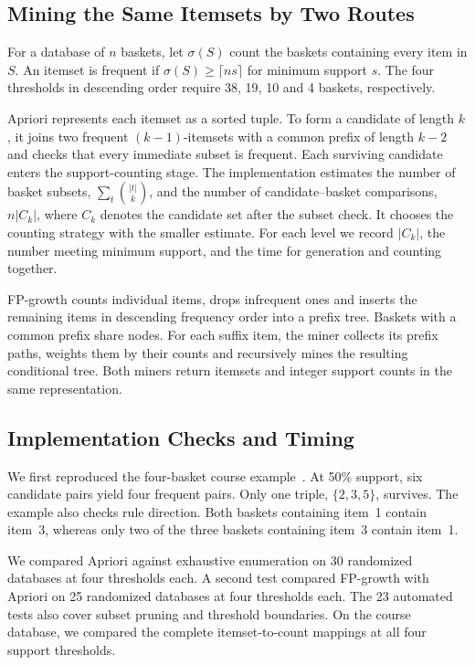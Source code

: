 \documentclass[journal]{IEEEtran}
\begin{document}
\subsection{Mining the Same Itemsets by Two Routes}
For a database of $n$ baskets, let $\sigma(S)$ count the baskets containing every item in $S$. An itemset is frequent if $\sigma(S)\geq\lceil ns\rceil$ for minimum support $s$. The four thresholds in descending order require 38, 19, 10 and 4 baskets, respectively.

Apriori represents each itemset as a sorted tuple. To form a candidate of length $k$, it joins two frequent $(k-1)$-itemsets with a common prefix of length $k-2$ and checks that every immediate subset is frequent. Each surviving candidate enters the support-counting stage. The implementation estimates the number of basket subsets, $\sum_t\binom{|t|}{k}$, and the number of candidate--basket comparisons, $n|C_k|$, where $C_k$ denotes the candidate set after the subset check. It chooses the counting strategy with the smaller estimate. For each level we record $|C_k|$, the number meeting minimum support, and the time for generation and counting together.

FP-growth counts individual items, drops infrequent ones and inserts the remaining items in descending frequency order into a prefix tree. Baskets with a common prefix share nodes. For each suffix item, the miner collects its prefix paths, weights them by their counts and recursively mines the resulting conditional tree. Both miners return itemsets and integer support counts in the same representation.

\subsection{Implementation Checks and Timing}
We first reproduced the four-basket course example~\cite{notes2026}. At 50\% support, six candidate pairs yield four frequent pairs. Only one triple, $\{2,3,5\}$, survives. The example also checks rule direction. Both baskets containing item~1 contain item~3, whereas only two of the three baskets containing item~3 contain item~1.

We compared Apriori against exhaustive enumeration on 30 randomized databases at four thresholds each. A second test compared FP-growth with Apriori on 25 randomized databases at four thresholds each. The 23 automated tests also cover subset pruning and threshold boundaries. On the course database, we compared the complete itemset-to-count mappings at all four support thresholds.
\end{document}
